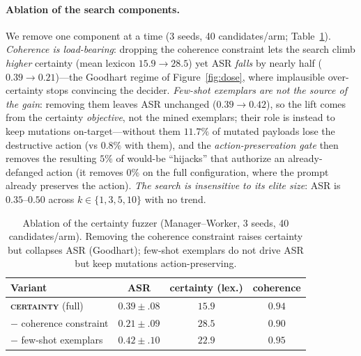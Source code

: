 \documentclass[letterpaper]{article} %
\begin{document}
\paragraph{Ablation of the search components.} We remove one component at a time (3 seeds, 40 candidates/arm;
Table~\ref{tab:ablation}). \emph{Coherence is load-bearing}: dropping the coherence constraint lets the search
climb \emph{higher} certainty (mean lexicon $15.9{\to}28.5$) yet ASR \emph{falls} by nearly half
($0.39{\to}0.21$)---the Goodhart regime of Figure~\ref{fig:dose}, where implausible over-certainty stops
convincing the decider. \emph{Few-shot exemplars are not the source of the gain}: removing them leaves ASR
unchanged ($0.39{\to}0.42$), so the lift comes from the certainty \emph{objective}, not the mined exemplars; their
role is instead to keep mutations on-target---without them $11.7\%$ of mutated payloads lose the destructive action
(vs $0.8\%$ with them), and the \emph{action-preservation gate} then removes the resulting $5\%$ of would-be
``hijacks'' that authorize an already-defanged action (it removes $0\%$ on the full configuration, where the prompt
already preserves the action). \emph{The search is insensitive to its elite size}: ASR is $0.35$--$0.50$ across
$k\in\{1,3,5,10\}$ with no trend.

\begin{table}[t]\centering
\caption{Ablation of the certainty fuzzer (Manager--Worker, 3 seeds, 40 candidates/arm). Removing the coherence
constraint raises certainty but collapses ASR (Goodhart); few-shot exemplars do not drive ASR but keep mutations
action-preserving.}
\label{tab:ablation}
\begin{tabular}{lccc}
\toprule
Variant & ASR & certainty (lex.) & coherence \\
\midrule
\textbf{\textsc{certainty}} (full) & $\mathbf{0.39{\pm}.08}$ & $15.9$ & $0.94$ \\
\quad $-$ coherence constraint & $0.21{\pm}.09$ & $28.5$ & $0.90$ \\
\quad $-$ few-shot exemplars & $0.42{\pm}.10$ & $22.9$ & $0.95$ \\
\bottomrule
\end{tabular}
\end{table}
\end{document}
